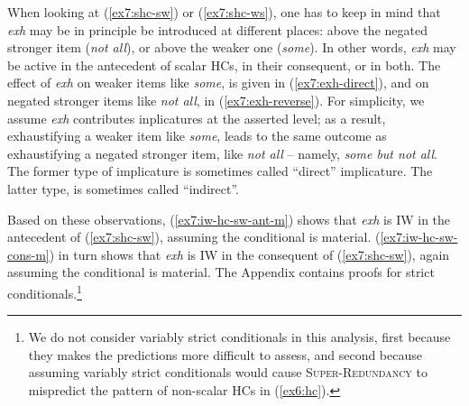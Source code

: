 When looking at (\ref{ex7:shc-sw}) or (\ref{ex7:shc-ws}), one has to keep in mind that \textit{exh} may be in principle be introduced at different places: above the negated stronger item (\textit{not all}), or above the weaker one (\textit{some}). In other words, \textit{exh} may be active in the antecedent of scalar HCs, in their consequent, or in both. The effect of \textit{exh} on weaker items like \textit{some}, is given in (\ref{ex7:exh-direct}), and on negated stronger items like \textit{not all}, in (\ref{ex7:exh-reverse}). For simplicity, we assume \textit{exh} contributes inplicatures at the asserted level; as a result, exhaustifying a weaker item like \textit{some}, leads to the same outcome as exhaustifying a negated stronger item, like \textit{not all} -- namely, \textit{some but not all}. The former type of implicature is sometimes called ``direct'' implicature. The latter type, is sometimes called ``indirect''.

\begin{exe}
	\label{ex7:exh-direct}
	\label{ex7:exh-reverse}
\end{exe}

Based on these observations, (\ref{ex7:iw-hc-sw-ant-m}) shows that \textit{exh} is IW in the antecedent of (\ref{ex7:shc-sw}), assuming the conditional is material. (\ref{ex7:iw-hc-sw-cons-m}) in turn shows that \textit{exh} is IW in the consequent of (\ref{ex7:shc-sw}), again assuming the conditional is material. The Appendix contains proofs for strict conditionals.\footnote{We do not consider variably strict conditionals in this analysis, first because they makes the predictions more difficult to assess, and second because assuming variably strict conditionals would cause \textsc{Super-Redundancy} to mispredict the pattern of non-scalar HCs in (\ref{ex6:hc}).}


